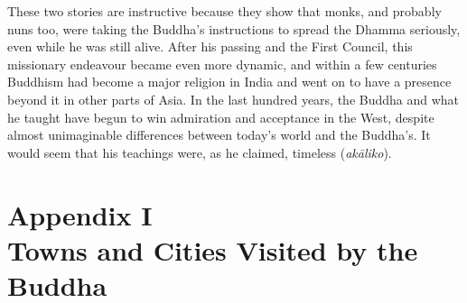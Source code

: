 These two stories are instructive because they show that monks, and
probably nuns too, were taking the Buddha's instructions to spread the
Dhamma seriously, even while he was still alive. After his passing and
the First Council, this missionary endeavour became even more dynamic,
and within a few centuries Buddhism had become a major religion in India
and went on to have a presence beyond it in other parts of Asia. In the
last hundred years, the Buddha and what he taught have begun to win
admiration and acceptance in the West, despite almost unimaginable
differences between today's world and the Buddha's. It would seem that
his teachings were, as he claimed, timeless (\emph{akāliko}).

\label{footprints_split_018.html_calibre_pb_37}

\label{footprints_split_019.html}{}

\section{\texorpdfstring{{Appendix I}\\
Towns and Cities Visited by the
Buddha}{Appendix I Towns and Cities Visited by the Buddha}}\label{footprints_split_019.html_TOCTarget999-1}

